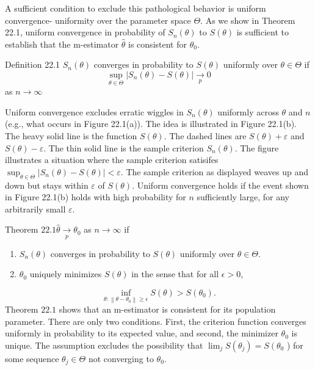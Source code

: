 \documentclass[10pt]{article}
\begin{document}
A sufficient condition to exclude this pathological behavior is uniform convergence- uniformity over the parameter space $\Theta$. As we show in Theorem 22.1, uniform convergence in probability of $S_{n}(\theta)$ to $S(\theta)$ is sufficient to establish that the m-estimator $\widehat{\theta}$ is consistent for $\theta_{0}$.

Definition 22.1 $S_{n}(\theta)$ converges in probability to $S(\theta)$ uniformly over $\theta \in \Theta$ if
$$
\sup _{\theta \in \Theta}\left|S_{n}(\theta)-S(\theta)\right| \underset{p}{\longrightarrow} 0
$$
as $n \rightarrow \infty$

Uniform convergence excludes erratic wiggles in $S_{n}(\theta)$ uniformly across $\theta$ and $n$ (e.g., what occurs in Figure 22.1(a)). The idea is illustrated in Figure 22.1(b). The heavy solid line is the function $S(\theta)$. The dashed lines are $S(\theta)+\varepsilon$ and $S(\theta)-\varepsilon$. The thin solid line is the sample criterion $S_{n}(\theta)$. The figure illustrates a situation where the sample criterion satisifes $\sup _{\theta \in \Theta}\left|S_{n}(\theta)-S(\theta)\right|<\varepsilon$. The sample criterion as displayed weaves up and down but stays within $\varepsilon$ of $S(\theta)$. Uniform convergence holds if the event shown in Figure 22.1(b) holds with high probability for $n$ sufficiently large, for any arbitrarily small $\varepsilon$.

Theorem $22.1 \hat{\theta} \underset{p}{\longrightarrow} \theta_{0}$ as $n \rightarrow \infty$ if

\begin{enumerate}
  \item $S_{n}(\theta)$ converges in probability to $S(\theta)$ uniformly over $\theta \in \Theta$.

  \item $\theta_{0}$ uniquely minimizes $S(\theta)$ in the sense that for all $\epsilon>0$,

\end{enumerate}
$$
\inf _{\theta:\left\|\theta-\theta_{0}\right\| \geq \epsilon} S(\theta)>S\left(\theta_{0}\right) .
$$
Theorem $22.1$ shows that an m-estimator is consistent for its population parameter. There are only two conditions. First, the criterion function converges uniformly in probability to its expected value, and second, the minimizer $\theta_{0}$ is unique. The assumption excludes the possibility that $\lim _{j} S\left(\theta_{j}\right)=S\left(\theta_{0}\right.$ ) for some sequence $\theta_{j} \in \Theta$ not converging to $\theta_{0}$.
\end{document}

